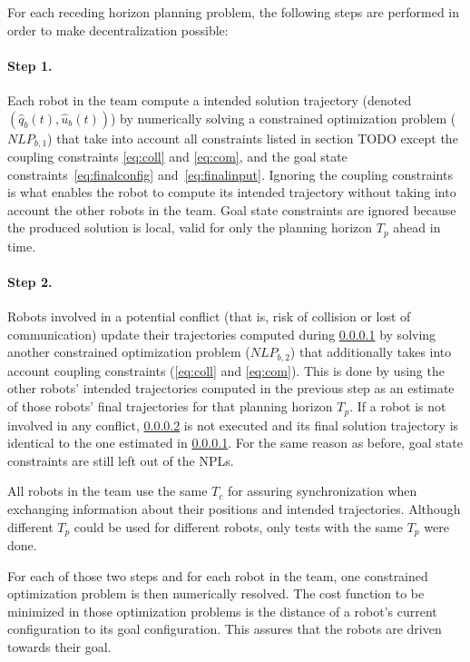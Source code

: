For each receding horizon planning problem, the following steps are performed in order to make decentralization possible:
\paragraph{Step 1.}\label{step1} Each robot in the team compute a intended solution trajectory (denoted $(\hat{q}_b(t), \hat{u}_b(t))$)
by numerically solving a constrained optimization problem ($NLP_{b,1}$) that take into account all constraints listed in section TODO except the coupling
constraints \ref{eq:coll} and \ref{eq:com}, and the goal state constraints~\ref{eq:finalconfig} and~\ref{eq:finalinput}. Ignoring the coupling constraints is what enables the robot to compute its intended trajectory without taking into account the other robots in the team. Goal state constraints are ignored because the produced solution is local, valid for only the planning horizon $T_p$ ahead in time.
\paragraph{Step 2.}\label{step2} Robots involved in a potential conflict
(that is, risk of collision or lost of communication) update their trajectories
computed during \ref{step1} by solving another constrained optimization problem ($NLP_{b,2}$) that additionally takes into account
coupling constraints (\ref{eq:coll} and \ref{eq:com}).
This is done by using the other robots' intended
trajectories computed in the previous step as an estimate of those robots'
final trajectories for that planning horizon $T_p$.
If a robot is not involved in any conflict, \ref{step2}
is not executed and its final
solution trajectory is identical to the one estimated in \ref{step1}. For the same reason as before, goal state constraints are still left out of the NPLs.

\mbox{}

All robots in the team use the same $T_c$ for assuring synchronization when exchanging information about their positions and intended trajectories.
Although different $T_p$ could be used for different robots, only tests with the same $T_p$ were done.

For each of those two steps and for each robot in the team, one constrained optimization problem is then numerically resolved. The cost function to be minimized in those
optimization problems
is the distance of a robot's current configuration to its goal configuration.
This assures that the robots are driven towards their goal.


